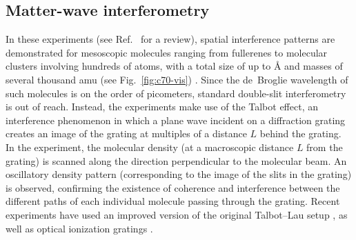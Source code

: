 \documentclass[aps,pra,reprint,amsmath,amssymb,showpacs,nofootinbib,floatfix,onecolumn,12pt]{revtex4-1}
\begin{document}
\subsection{\label{sec:matt-wave-interf}Matter-wave interferometry}


In these experiments (see Ref.~\cite{Hornberger:2012:ii} for a review), spatial interference patterns are demonstrated for mesoscopic molecules ranging from fullerenes \cite{Arndt:1999:rc} to molecular clusters involving hundreds of atoms, with a total size of up to \unit[60]{\AA} and masses of several thousand amu (see Fig.~\ref{fig:c70-vis}) \cite{Gerlich:2011:aa,Eibenberger:2013:az}. Since the de~Broglie wavelength of such molecules is on the order of picometers, standard double-slit interferometry is out of reach. Instead, the experiments make use of the Talbot effect, an interference phenomenon in which a plane wave incident on a diffraction grating creates an image of the grating at multiples of a distance $L$ behind the grating. In the experiment, the molecular density (at a macroscopic distance $L$ from the grating) is scanned along the direction perpendicular to the molecular beam. An oscillatory density pattern (corresponding to the image of the slits in the grating) is observed, confirming the existence of coherence and interference between the different paths of each individual molecule passing through the grating. Recent experiments have used an improved version of the original Talbot--Lau setup \cite{Gerlich:2007:om}, as well as optical ionization gratings \cite{Haslinger:2013:ii}.
\end{document}
